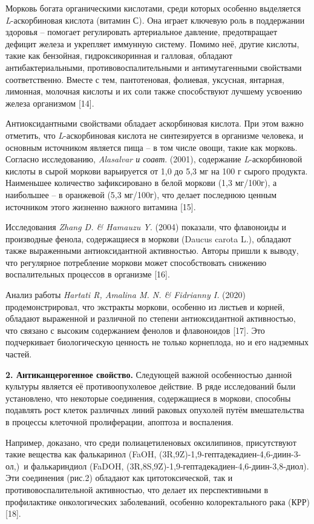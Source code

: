 \begin{multicols}{2}
Морковь богата органическими кислотами, среди которых особенно
выделяется \emph{L}-аскорбиновая кислота (витамин С). Она играет
ключевую роль в поддержании здоровья -- помогает регулировать
артериальное давление, предотвращает дефицит железа и укрепляет иммунную
систему. Помимо неё, другие кислоты, такие как бензойная,
гидроксикоринная и галловая, обладают антибактериальными,
противовоспалительными и антимутагенными свойствами соответственно.
Вместе с тем, пантотеновая, фолиевая, уксусная, янтарная, лимонная,
молочная кислоты и их соли также способствуют лучшему усвоению железа
организмом {[}14{]}.

Антиоксидантными свойствами обладает аскорбиновая кислота. При этом
важно отметить, что \emph{L}-аскорбиновая кислота не синтезируется в
организме человека, и основным источником является пища -- в том числе
овощи, такие как морковь. Согласно исследованию, \emph{Alasalvar и
соавт}. (2001), содержание \emph{L}-аскорбиновой кислоты в сырой моркови
варьируется от 1,0 до 5,3 мг на 100 г сырого продукта. Наименьшее
количество зафиксировано в белой моркови (1,3 мг/100г), а наибольшее --
в оранжевой (5,3 мг/100г), что делает последнюю ценным источником этого
жизненно важного витамина {[}15{]}.

Исследования \emph{Zhang D. \& Hamauzu Y.} (2004) показали, что
флавоноиды и производные фенола, содержащиеся в моркови (Daucus carota
L.), обладают также выраженными антиоксидантной активностью. Авторы
пришли к выводу, что регулярное потребление моркови может способствовать
снижению воспалительных процессов в организме {[}16{]}.

Анализ работы \emph{Hartati R, Amalina M. N. \& Fidrianny I.} (2020)
продемонстрировал, что экстракты моркови, особенно из листьев и корней,
обладают выраженной и различной по степени антиоксидантной активностью,
что связано с высоким содержанием фенолов и флавоноидов {[}17{]}. Это
подчеркивает биологическую ценность не только корнеплода, но и его
надземных частей.

{\bfseries 2. Антиканцерогенное свойство.} Следующей важной особенностью
данной культуры является её противоопухолевое действие. В ряде
исследований были установлено, что некоторые соединения, содержащиеся в
моркови, способны подавлять рост клеток различных линий раковых опухолей
путём вмешательства в процессы клеточной пролиферации, апоптоза и
воспаления.

Например, доказано, что среди полиацетиленовых оксилипинов, присутствуют
такие вещества как фалькаринол (FaOH,
(3R,9Z)-1,9-гептадекадиен-4,6-диин-3-ол,)~и фалькариндиол (FaDOH,
(3R,8S,9Z)-1,9-гептадекадиен-4,6-диин-3,8-диол). Эти соединения (рис.2)
обладают как цитотоксической, так и противовоспалительной активностью,
что делает их перспективными в профилактике онкологических заболеваний,
особенно колоректального рака (КРР) {[}18{]}.


\end{multicols}

